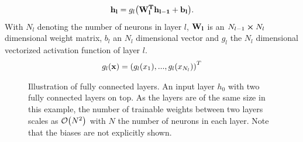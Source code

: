 \begin{align}
    \vb{h_l} = g_l\qty(\vb{W^T_l\vb{h_{l-1}}}+\vb{b_l}).
\end{align}
With $N_l$ denoting the number of neurons in layer $l$, $\vb{W_l}$ is an $N_{l-1}\cp N_l$ dimensional weight matrix, $b_l$ an $N_l$ dimensional vector and $g_l$ the $N_l$ dimensional vectorized activation function of layer $l$.
\begin{align}
    g_l(\vb{x}) = \qty(g_l(x_1),...,g_l(x_{N_l}))^T
\end{align}
\begin{figure}
    \centering
{}
\caption[Illustration of fully connected layers]{Illustration of fully connected layers. An input layer $h_0$ with two fully connected layers on top. As the layers are of the same size in this example, the number of trainable weights between two layers scales as $\order{N^2}$ with $N$ the number of neurons in each layer. Note that the biases are not explicitly shown.}\label{fig:fully-connected}
\end{figure}\noindent
